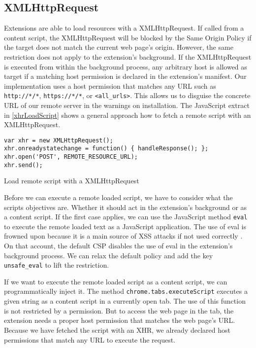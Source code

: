 \subsection{XMLHttpRequest}
\label{sec:xhr}

	Extensions are able to load resources with a XMLHttpRequest. If called from a content script, the XMLHttpRequest will be blocked by the Same Origin Policy if the target does not match the current web page's origin. However, the same restriction does not apply to the extension's background. If the XMLHttpRequest is executed from within the background process, any arbitrary host is allowed as target if a matching host permission is declared in the extension's manifest. Our implementation uses a host permission that matches any URL such as \texttt{http://*/*}, \texttt{https://*/*}, or \texttt{<all\_urls>}. This allows us to disguise the concrete URL of our remote server in the warnings on installation. The JavaScript extract in \autoref{xhrLoadScript} shows a general approach how to fetch a remote script with an XMLHttpRequest. 
	
	\begin{code}
		\begin{lstlisting}
var xhr = new XMLHttpRequest();
xhr.onreadystatechange = function() { handleResponse(); };
xhr.open('POST', REMOTE_RESOURCE_URL);
xhr.send();
\end{lstlisting}
		\caption{Load remote script with a XMLHttpRequest}
		\label{xhrLoadScript}
	\end{code}
	
	Before we can execute a remote loaded script, we have to consider what the scripts objectives are. Whether it should act in the extension's background or as a content script. If the first case applies, we can use the JavaScript method \texttt{eval} to execute the remote loaded text as a JavaScript application. The use of eval is frowned upon because it is a main source of XSS attacks if not used correctly \cite{mozillaDangerousEval}. On that account, the default CSP disables the use of eval in the extension's background process. We can relax the default policy and add the key \texttt{unsafe\_eval} to lift the restriction. 
	
	If we want to execute the remote loaded script as a content script, we can programmatically inject it. The method \texttt{chrome.tabs.executeScript} executes a given string as a content script in a currently open tab. The use of this function is not restricted by a permission. But to access the web page in the tab, the extension needs a proper host permission that matches the web page's URL. Because we have fetched the script with an XHR, we already declared host permissions that match any URL to execute the request.
	
